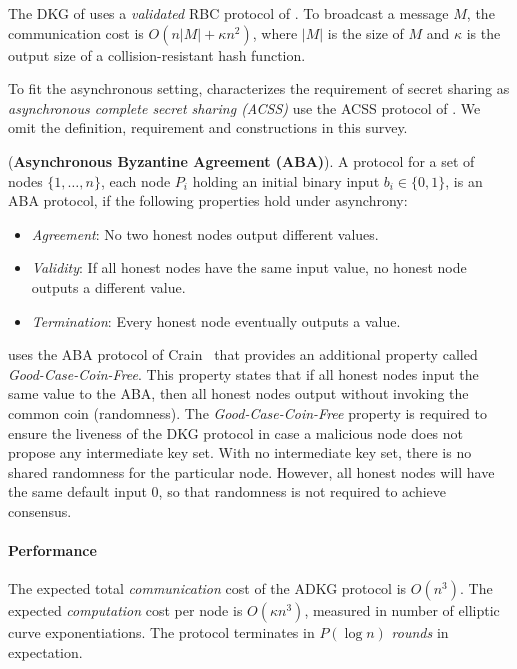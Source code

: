 The DKG of \cite{DBLP:conf/sp/DasYXMK022} uses a \textit{validated} RBC protocol of \cite{DBLP:conf/ccs/DasX021}. To broadcast a message $M$, the communication cost is $O(n|M| + \kappa n^2)$, where $|M|$ is the size of $M$ and $\kappa$ is the output size of a collision-resistant hash function.  

To fit the asynchronous setting, \cite{DBLP:conf/sp/DasYXMK022} characterizes the requirement of secret sharing as \textit{asynchronous complete secret sharing (ACSS)} use the ACSS protocol of \cite{DBLP:conf/ccs/DasX021}. We omit the definition, requirement and constructions in this survey. 

\begin{definition} (\textbf{Asynchronous Byzantine Agreement (ABA)}). 
    A protocol for a set of nodes $\{1,\dots, n\}$, each node $P_i$ holding an initial binary input $b_i\in\{0,1\}$, is an ABA protocol, if the following properties hold under asynchrony:
    \begin{itemize}
        \item \textit{Agreement}: No two honest nodes output different values. 
        \item \textit{Validity}: If all honest nodes have the same input value, no honest node outputs a different value. 
        \item \textit{Termination}: Every honest node eventually outputs a value. 
    \end{itemize}
\end{definition}

\cite{DBLP:conf/sp/DasYXMK022} uses the ABA protocol of Crain~\cite{DBLP:journals/corr/abs-2002-08765} that provides an additional property called \textit{Good-Case-Coin-Free}. This property states that if all honest nodes input the same value to the ABA, then all honest nodes output without invoking the common coin (randomness).  The \textit{Good-Case-Coin-Free} property is required to ensure the liveness of the DKG protocol in case a malicious node does not propose any intermediate key set. With no intermediate key set, there is no shared randomness for the particular node. However, all honest nodes will have the same default input $0$, so that randomness is not required to achieve consensus. 


\paragraph{Performance} The expected total \textit{communication} cost of the ADKG protocol is $O(n^3)$. The expected \textit{computation} cost per node is $O(\kappa n^3)$, measured in number of elliptic curve exponentiations. The protocol terminates in $P(\log{n})$ \textit{rounds} in expectation. 